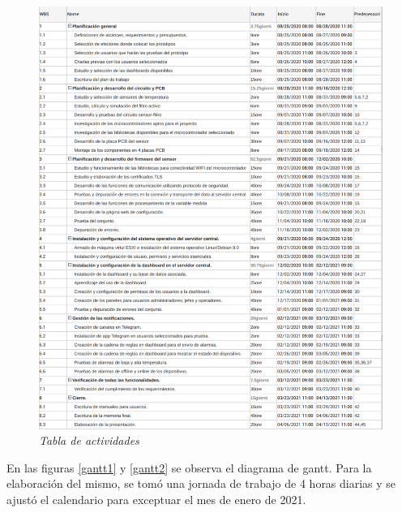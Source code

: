 \documentclass[11pt]{charter}
\begin{document}
\begin{figure}[htpb]
\centering 
\includegraphics[width=1\textwidth]{./Figuras/wbs.pdf}
\caption{\textit{Tabla de actividades}}
\label{wbs}
\end{figure}




En las figuras \ref{gantt1} y \ref{gantt2} se observa el diagrama de gantt.
Para la elaboración del mismo, se tomó una jornada de trabajo de 4 horas diarias y se ajustó el calendario para exceptuar el mes de enero de 2021.
\end{document}
